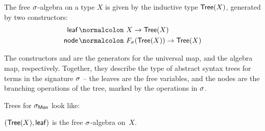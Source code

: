 \begin{definition}
    \label{algebra:tree}
    \label{def:free-algebra-construction}
    The free $\sigma$-algebra on a type $X$ is given by the inductive type $\mathsf{Tree}(X)$,
    generated by two constructors:
    \begin{align*}
        \term{leaf} & \colon X \to \type{Tree}(X)                      \\
        \term{node} & \colon F_\sig(\type{Tree}(X)) \to \type{Tree}(X)
    \end{align*}
\end{definition}
The constructors  and  are
the generators for the universal map, and the algebra map, respectively.
%
Together, they describe the type of abstract syntax trees for terms in the signature $\sigma$
-- the leaves are the free variables, and the nodes are the branching operations of the tree,
marked by the operations in $\sigma$.
\begin{toappendix}
    \begin{example}
        Trees for $\sigma_{\mathsf{Mon}}$ look like:
        \begin{center}
            \qquad\qquad
        \end{center}
    \end{example}
\end{toappendix}
%
\begin{proposition}
    \label{prop:free-algebra-construction-is}
    $(\mathsf{Tree}(X), \operatorname{\mathsf{leaf}})$ is the free $\sigma$-algebra on~$X$. %
\end{proposition}

